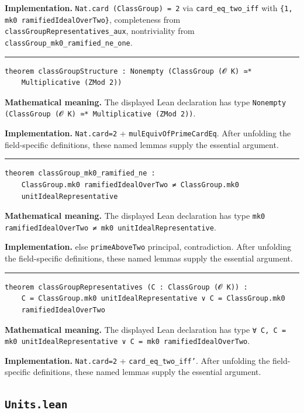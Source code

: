 \documentclass[UTF8,a4paper,11pt,fontset=fandol]{ctexart}
\theoremstyle{definition}
\newcommand{\statementsep}{\par\medskip\hrule\medskip}
\begin{document}
\noindent\textbf{Implementation.} \texttt{Nat.\allowbreak{}card (ClassGroup) = 2} via \texttt{card\_\allowbreak{}eq\_\allowbreak{}two\_\allowbreak{}iff} with \texttt{\{1, mk0 ramifiedIdealOverTwo\}}, completeness from \texttt{classGroupRepresentatives\_\allowbreak{}aux}, nontriviality from \texttt{classGroup\_\allowbreak{}mk0\_\allowbreak{}ramified\_\allowbreak{}ne\_\allowbreak{}one}.\par
\statementsep
\begin{verbatim}
theorem classGroupStructure : Nonempty (ClassGroup (𝓞 K) ≃*
    Multiplicative (ZMod 2))
\end{verbatim}
\noindent\textbf{Mathematical meaning.} The displayed Lean declaration has type \texttt{Nonempty (ClassGroup (𝓞 K) ≃* Multiplicative (ZMod 2))}.\par
\noindent\textbf{Implementation.} \texttt{Nat.\allowbreak{}card=2} + \texttt{mulEquivOfPrimeCardEq}. After unfolding the field-specific definitions, these named lemmas supply the essential argument.\par
\statementsep
\begin{verbatim}
theorem classGroup_mk0_ramified_ne :
    ClassGroup.mk0 ramifiedIdealOverTwo ≠ ClassGroup.mk0
    unitIdealRepresentative
\end{verbatim}
\noindent\textbf{Mathematical meaning.} The displayed Lean declaration has type \texttt{mk0 ramifiedIdealOverTwo ≠ mk0 unitIdealRepresentative}.\par
\noindent\textbf{Implementation.} else \texttt{primeAboveTwo} principal, contradiction. After unfolding the field-specific definitions, these named lemmas supply the essential argument.\par
\statementsep
\begin{verbatim}
theorem classGroupRepresentatives (C : ClassGroup (𝓞 K)) :
    C = ClassGroup.mk0 unitIdealRepresentative ∨ C = ClassGroup.mk0
    ramifiedIdealOverTwo
\end{verbatim}
\noindent\textbf{Mathematical meaning.} The displayed Lean declaration has type \texttt{∀ C, C = mk0 unitIdealRepresentative ∨ C = mk0 ramifiedIdealOverTwo}.\par
\noindent\textbf{Implementation.} \texttt{Nat.\allowbreak{}card=2} + \texttt{card\_\allowbreak{}eq\_\allowbreak{}two\_\allowbreak{}iff'}. After unfolding the field-specific definitions, these named lemmas supply the essential argument.\par

\subsection{\texttt{Units.lean}}
\end{document}
